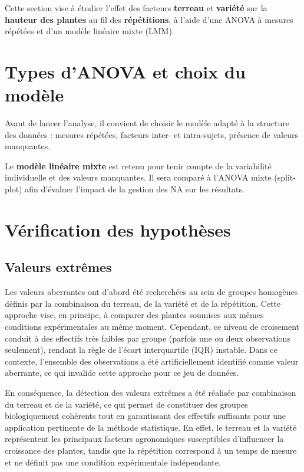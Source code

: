\documentclass[12pt, a4paper]{report}
\begin{document}
Cette section vise à étudier l'effet des facteurs \textbf{terreau} et \textbf{variété} sur
la \textbf{hauteur des plantes} au fil des \textbf{répétitions}, à l'aide d'une ANOVA à
mesures répétées et d'un modèle linéaire mixte (LMM).

\section{Types d'ANOVA et choix du modèle}

Avant de lancer l'analyse, il convient de choisir le modèle adapté à la structure des
données : mesures répétées, facteurs inter- et intra-sujets, présence de valeurs manquantes.

Le \textbf{modèle linéaire mixte} est retenu pour tenir compte de la variabilité individuelle
et des valeurs manquantes. Il sera comparé à l'ANOVA mixte (split-plot) afin d'évaluer l'impact de la
gestion des NA sur les résultats.

\section{Vérification des hypothèses}

\subsection*{Valeurs extrêmes}
Les valeurs aberrantes ont d’abord été recherchées au sein de groupes homogènes définis par la combinaison du terreau, de la variété et de la répétition. Cette approche vise, en principe, à comparer des plantes soumises aux mêmes conditions expérimentales au même moment. Cependant, ce niveau de croisement conduit à des effectifs très faibles par groupe (parfois une ou deux observations seulement), rendant la règle de l’écart interquartile (IQR) instable. Dans ce contexte, l’ensemble des observations a été artificiellement identifié comme valeur aberrante, ce qui invalide cette approche pour ce jeu de données.

En conséquence, la détection des valeurs extrêmes a été réalisée par combinaison du terreau et de la variété, ce qui permet de constituer des groupes biologiquement cohérents tout en garantissant des effectifs suffisants pour une application pertinente de la méthode statistique. En effet, le terreau et la variété représentent les principaux facteurs agronomiques susceptibles d’influencer la croissance des plantes, tandis que la répétition correspond à un temps de mesure et ne définit pas une condition expérimentale indépendante.
\end{document}

